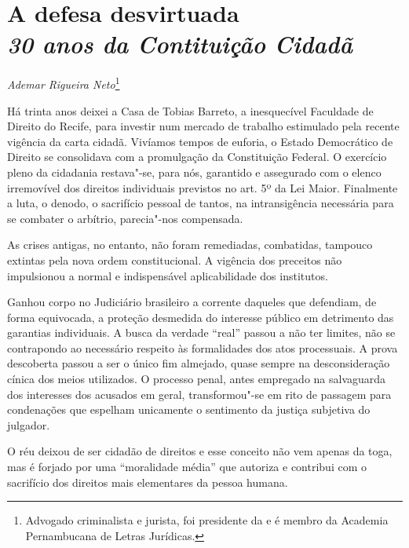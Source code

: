 \chapter*{A defesa desvirtuada\\
\emph{30 anos da Contituição Cidadã}}


\begin{flushright}
\emph{Ademar Rigueira Neto}\footnote{Advogado criminalista e jurista, foi
presidente da  e é membro da Academia Pernambucana de Letras
Jurídicas.}
\end{flushright}

Há trinta anos deixei a Casa de Tobias Barreto, a inesquecível Faculdade
de Direito do Recife, para investir num mercado de trabalho estimulado
pela recente vigência da carta cidadã. Vivíamos tempos de euforia, o
Estado Democrático de Direito se consolidava com a promulgação da
Constituição Federal. O exercício pleno da cidadania restava"-se, para
nós, garantido e assegurado com o elenco irremovível dos direitos
individuais previstos no art. 5º da Lei Maior. Finalmente a luta, o
denodo, o sacrifício pessoal de tantos, na intransigência necessária
para se combater o arbítrio, parecia"-nos compensada.

As crises antigas, no entanto, não foram remediadas, combatidas,
tampouco extintas pela nova ordem constitucional. A vigência dos
preceitos não impulsionou a normal e indispensável aplicabilidade dos
institutos.

Ganhou corpo no Judiciário brasileiro a corrente daqueles que defendiam,
de forma equivocada, a proteção desmedida do interesse público em
detrimento das garantias individuais. A busca da verdade ``real'' passou
a não ter limites, não se contrapondo ao necessário respeito às
formalidades dos atos processuais. A prova descoberta passou a ser o
único fim almejado, quase sempre na desconsideração cínica dos meios
utilizados. O processo penal, antes empregado na salvaguarda dos
interesses dos acusados em geral, transformou"-se em rito de passagem
para condenações que espelham unicamente o sentimento da justiça
subjetiva do julgador.

O réu deixou de ser cidadão de direitos e esse conceito não vem apenas
da toga, mas é forjado por uma ``moralidade média'' que autoriza e
contribui com o sacrifício dos direitos mais elementares da pessoa
humana.

